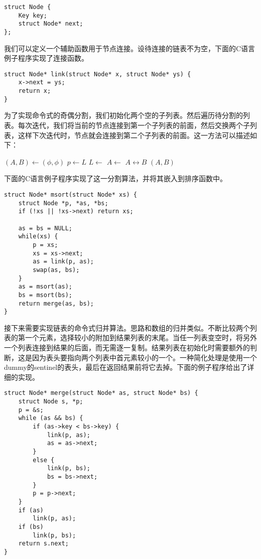 \documentclass[UTF8]{article}
\begin{document}
\lstset{language=C}
\begin{lstlisting}
struct Node {
    Key key;
    struct Node* next;
};
\end{lstlisting}

我们可以定义一个辅助函数用于节点连接。设待连接的链表不为空，下面的C语言例子程序实现了连接函数。

\lstset{language=C}
\begin{lstlisting}
struct Node* link(struct Node* x, struct Node* ys) {
    x->next = ys;
    return x;
}
\end{lstlisting}

为了实现命令式的奇偶分割，我们初始化两个空的子列表。然后遍历待分割的列表。每次迭代，我们将当前的节点连接到第一个子列表的前面，然后交换两个子列表，这样下次迭代时，节点就会连接到第二个子列表的前面。这一方法可以描述如下：

\begin{algorithmic}[1]
  \State $(A, B) \gets (\phi, \phi)$
    \State $p \gets L$
    \State $L \gets $ 
    \State $A \gets $ 
    \State {} $A \leftrightarrow B$
  \EndWhile
  \State \Return $(A, B)$
\EndFunction
\end{algorithmic}

下面的C语言例子程序实现了这一分割算法，并将其嵌入到排序函数中。

\lstset{language=C}
\begin{lstlisting}
struct Node* msort(struct Node* xs) {
    struct Node *p, *as, *bs;
    if (!xs || !xs->next) return xs;

    as = bs = NULL;
    while(xs) {
        p = xs;
        xs = xs->next;
        as = link(p, as);
        swap(as, bs);
    }
    as = msort(as);
    bs = msort(bs);
    return merge(as, bs);
}
\end{lstlisting}

接下来需要实现链表的命令式归并算法。思路和数组的归并类似。不断比较两个列表的第一个元素，选择较小的附加到结果列表的末尾。当任一列表变空时，将另外一个列表连接到结果的后面，而无需逐一复制。结果列表在初始化时需要额外的判断，这是因为表头要指向两个列表中首元素较小的一个。一种简化处理是使用一个dummy的sentinel的表头，最后在返回结果前将它去掉。下面的例子程序给出了详细的实现。

\lstset{language=C}
\begin{lstlisting}
struct Node* merge(struct Node* as, struct Node* bs) {
    struct Node s, *p;
    p = &s;
    while (as && bs) {
        if (as->key < bs->key) {
            link(p, as);
            as = as->next;
        }
        else {
            link(p, bs);
            bs = bs->next;
        }
        p = p->next;
    }
    if (as)
        link(p, as);
    if (bs)
        link(p, bs);
    return s.next;
}
\end{lstlisting}
\end{document}
